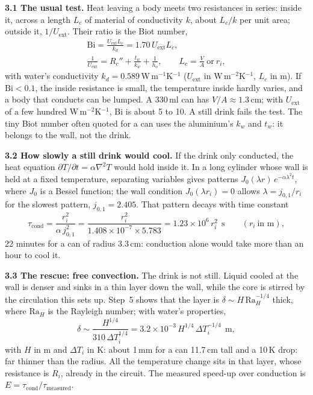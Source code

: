 \documentclass[11pt,a4paper]{article}
\newcommand{\sub}[1]{\par\smallskip\noindent\textbf{#1}\enspace}
\begin{document}
\sub{3.1 The usual test.} Heat leaving a body meets two resistances in series: inside it, across a
length $L_c$ of material of conductivity $k$, about $L_c/k$ per unit area; outside it, $1/U_{\mathrm{ext}}$.
Their ratio is the Biot number,
\begin{gather*}
\mathrm{Bi} = \frac{U_{\mathrm{ext}}L_c}{k_d} = 1.70\,U_{\mathrm{ext}}L_c,
\\
\frac{1}{U_{\mathrm{ext}}} = R_c'' + \frac{t_w}{k_w} + \frac{1}{h_o}, \qquad
L_c = \frac{V}{A}\ \text{or}\ r_i ,
\end{gather*}
with water's conductivity $k_d = 0.589$\,W\,m$^{-1}$K$^{-1}$ ($U_{\mathrm{ext}}$ in W\,m$^{-2}$K$^{-1}$, $L_c$
in m). If $\mathrm{Bi} < 0.1$, the inside resistance is small, the temperature inside hardly varies, and a
body that conducts can be lumped. A 330\,ml can has $V/A \approx 1.3$\,cm; with $U_{\mathrm{ext}}$ of a few
hundred W\,m$^{-2}$K$^{-1}$, $\mathrm{Bi}$ is about 5 to 10. A still drink fails the test. The tiny Biot
number often quoted for a can uses the aluminium's $k_w$ and $t_w$: it belongs to the wall, not the drink.

\sub{3.2 How slowly a still drink would cool.} If the drink only conducted, the heat equation
$\partial T/\partial t = \alpha\nabla^2T$ would hold inside it. In a long cylinder whose wall is held at a
fixed temperature, separating variables gives patterns $J_0(\lambda r)\,e^{-\alpha\lambda^2t}$, where
$J_0$ is a Bessel function; the wall condition $J_0(\lambda r_i) = 0$ allows $\lambda = j_{0,1}/r_i$ for the
slowest pattern, $j_{0,1} = 2.405$. That pattern decays with time constant
\[
\tau_{\mathrm{cond}} = \frac{r_i^2}{\alpha\, j_{0,1}^2} = \frac{r_i^2}{1.408\times10^{-7}\times5.783}
= 1.23\times10^{6}\,r_i^2\ \ \text{s}\qquad(r_i\ \text{in m}),
\]
22 minutes for a can of radius 3.3\,cm: conduction alone would take more than an hour to cool it.

\sub{3.3 The rescue: free convection.} The drink is not still. Liquid cooled at the wall is denser and
sinks in a thin layer down the wall, while the core is stirred by the circulation this sets up. Step~5
shows that the layer is $\delta \sim H\,\mathrm{Ra}_H^{-1/4}$ thick, where $\mathrm{Ra}_H$ is the Rayleigh
number; with water's properties,
\[
\delta \sim \frac{H^{1/4}}{310\,\Delta T_i^{1/4}} = 3.2\times10^{-3}\,H^{1/4}\,\Delta T_i^{-1/4}\ \ \text{m},
\]
with $H$ in m and $\Delta T_i$ in K: about 1\,mm for a can 11.7\,cm tall and a 10\,K drop: far thinner than the radius. All the temperature
change sits in that layer, whose resistance is $R_i$, already in the circuit. The measured speed-up over
conduction is $E = \tau_{\mathrm{cond}}/\tau_{\mathrm{measured}}$.
\end{document}
